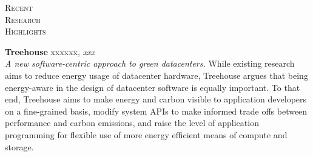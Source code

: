 \documentclass[10pt,times]{report}
\newlength{\sectiongap}
\newlength{\entrygap}
\newlength{\sectioncolwidth}
\newlength{\colgap}
\newlength{\stuffwidth}
\def\ifEqString#1#2{\def\testa{#1}\def\testb{#2}%
  \ifx\testa\testb}
\newenvironment{rtable}{
  \begin{minipage}{\textwidth}
  }{
  \end{minipage}
}
\newenvironment{rentry}[3][xxx]{
  \begin{minipage}[t]{\hsize}
    \textbf{#2}\ifEqString{#1}{xxx}\relax\else, \textit{#1}\fi
    \hspace{\stretch{1}} #3 \\
  }{
    \removelastskip
  \end{minipage}
  \\[\entrygap]  %
}
\newenvironment{rsection}[1]{
  \begin{minipage}[t]{\sectioncolwidth}
    \textsc{#1}
  \end{minipage}
  \hspace{\colgap}
  \begin{minipage}[t]{\stuffwidth}
  }{
    \removelastskip
  \end{minipage}
  \\[\sectiongap]
}
\begin{document}
\begin{rtable}
\begin{rsection}{Recent\\Research\\Highlights}
    \begin{rentry}{Treehouse}{}
      \textit{A new software-centric approach to green datacenters.}
      While existing research aims to reduce energy usage of
      datacenter hardware, Treehouse argues that being energy-aware in
      the design of datacenter software is equally important. To that
      end, Treehouse aims to make energy and carbon visible to
      application developers on a fine-grained basis, modify system
      APIs to make informed trade offs between performance and carbon
      emissions, and raise the level of application programming for
      flexible use of more energy efficient means of compute and
      storage.
    \end{rentry}
  \end{rsection}    
\end{rtable}
\end{document}
